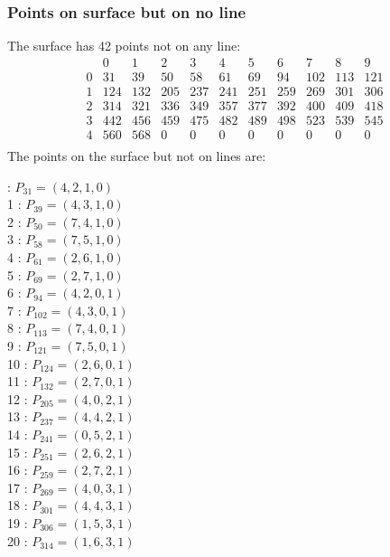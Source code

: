 \documentclass{article}
\begin{document}
{\subsubsection*{Points on surface but on no line}
The surface has 42 points not on any line:\\
$$
\begin{array}{r|*{10}{r}}
 & 0 & 1 & 2 & 3 & 4 & 5 & 6 & 7 & 8 & 9\\
\hline
0 & 31 & 39 & 50 & 58 & 61 & 69 & 94 & 102 & 113 & 121\\
1 & 124 & 132 & 205 & 237 & 241 & 251 & 259 & 269 & 301 & 306\\
2 & 314 & 321 & 336 & 349 & 357 & 377 & 392 & 400 & 409 & 418\\
3 & 442 & 456 & 459 & 475 & 482 & 489 & 498 & 523 & 539 & 545\\
4 & 560 & 568 & 0 & 0 & 0 & 0 & 0 & 0 & 0 & 0\\
\end{array}
$$
The points on the surface but not on lines are:\\
\begin{multicols}{2}
 : $P_{31}=( 4, 2, 1, 0 )$\\
1 : $P_{39}=( 4, 3, 1, 0 )$\\
2 : $P_{50}=( 7, 4, 1, 0 )$\\
3 : $P_{58}=( 7, 5, 1, 0 )$\\
4 : $P_{61}=( 2, 6, 1, 0 )$\\
5 : $P_{69}=( 2, 7, 1, 0 )$\\
6 : $P_{94}=( 4, 2, 0, 1 )$\\
7 : $P_{102}=( 4, 3, 0, 1 )$\\
8 : $P_{113}=( 7, 4, 0, 1 )$\\
9 : $P_{121}=( 7, 5, 0, 1 )$\\
10 : $P_{124}=( 2, 6, 0, 1 )$\\
11 : $P_{132}=( 2, 7, 0, 1 )$\\
12 : $P_{205}=( 4, 0, 2, 1 )$\\
13 : $P_{237}=( 4, 4, 2, 1 )$\\
14 : $P_{241}=( 0, 5, 2, 1 )$\\
15 : $P_{251}=( 2, 6, 2, 1 )$\\
16 : $P_{259}=( 2, 7, 2, 1 )$\\
17 : $P_{269}=( 4, 0, 3, 1 )$\\
18 : $P_{301}=( 4, 4, 3, 1 )$\\
19 : $P_{306}=( 1, 5, 3, 1 )$\\
20 : $P_{314}=( 1, 6, 3, 1 )$\\

\end{multicols}}
\end{document}
